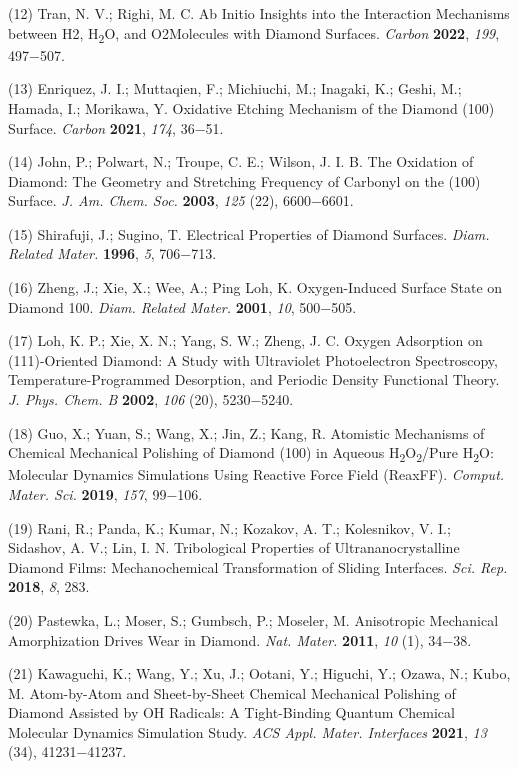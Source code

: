 \documentclass{article}
\begin{document}
\begin{hangpars}
(12) Tran, N. V.; Righi, M. C. Ab Initio Insights into the Interaction Mechanisms between H2, H\textsubscript{2}O, and O2Molecules with Diamond Surfaces. \textit{Carbon} \textbf{2022}, \textit{199}, 497−507.

(13) Enriquez, J. I.; Muttaqien, F.; Michiuchi, M.; Inagaki, K.; Geshi, M.; Hamada, I.; Morikawa, Y. Oxidative Etching Mechanism of the Diamond (100) Surface. \textit{Carbon} \textbf{2021}, \textit{174}, 36−51.

(14) John, P.; Polwart, N.; Troupe, C. E.; Wilson, J. I. B. The Oxidation of Diamond: The Geometry and Stretching Frequency of Carbonyl on the (100) Surface. \textit{J. Am. Chem. Soc.} \textbf{2003}, \textit{125} (22), 6600−6601.

(15) Shirafuji, J.; Sugino, T. Electrical Properties of Diamond Surfaces. \textit{Diam. Related Mater.} \textbf{1996}, \textit{5}, 706−713.

(16) Zheng, J.; Xie, X.; Wee, A.; Ping Loh, K. Oxygen-Induced Surface State on Diamond 100. \textit{Diam. Related Mater.} \textbf{2001}, \textit{10}, 500−505.

(17) Loh, K. P.; Xie, X. N.; Yang, S. W.; Zheng, J. C. Oxygen Adsorption on (111)-Oriented Diamond: A Study with Ultraviolet Photoelectron Spectroscopy, Temperature-Programmed Desorption, and Periodic Density Functional Theory. \textit{J. Phys. Chem. B} \textbf{2002}, \textit{106} (20), 5230−5240.

(18) Guo, X.; Yuan, S.; Wang, X.; Jin, Z.; Kang, R. Atomistic Mechanisms of Chemical Mechanical Polishing of Diamond (100) in Aqueous H\textsubscript{2}O\textsubscript{2}/Pure H\textsubscript{2}O: Molecular Dynamics Simulations Using Reactive Force Field (ReaxFF). \textit{Comput. Mater. Sci.} \textbf{2019}, \textit{157}, 99−106.

(19) Rani, R.; Panda, K.; Kumar, N.; Kozakov, A. T.; Kolesnikov, V. I.; Sidashov, A. V.; Lin, I. N. Tribological Properties of Ultrananocrystalline Diamond Films: Mechanochemical Transformation of Sliding Interfaces. \textit{Sci. Rep.} \textbf{2018}, \textit{8}, 283.

(20) Pastewka, L.; Moser, S.; Gumbsch, P.; Moseler, M. Anisotropic Mechanical Amorphization Drives Wear in Diamond. \textit{Nat. Mater.} \textbf{2011}, \textit{10} (1), 34−38.

(21) Kawaguchi, K.; Wang, Y.; Xu, J.; Ootani, Y.; Higuchi, Y.; Ozawa, N.; Kubo, M. Atom-by-Atom and Sheet-by-Sheet Chemical Mechanical Polishing of Diamond Assisted by OH Radicals: A Tight-Binding Quantum Chemical Molecular Dynamics Simulation Study. \textit{ACS Appl. Mater. Interfaces} \textbf{2021}, \textit{13} (34), 41231−41237.


\end{hangpars}
\end{document}
